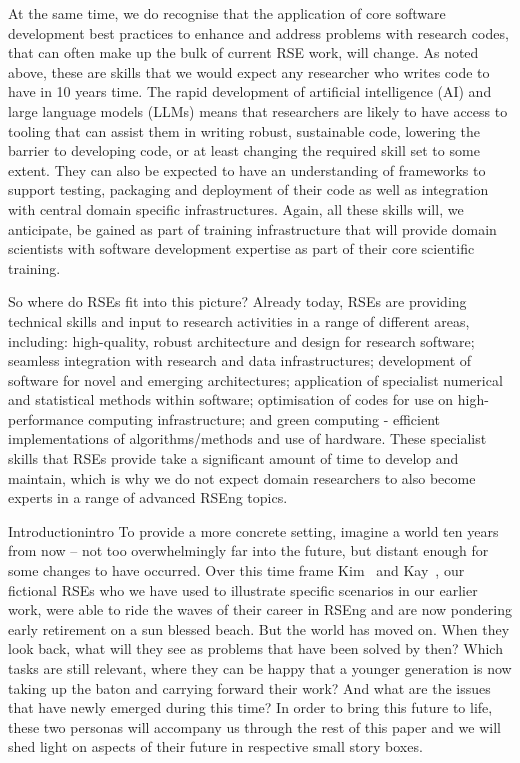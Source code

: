 \documentclass{eceasst}
\begin{document}
At the same time, we do recognise that the application of core software development best practices
to enhance and address problems with research codes, that can often make up the bulk of current RSE work, will change.
As noted above, these are skills that we would expect any researcher who writes code to have in 10 years time.
The rapid development of artificial intelligence (AI) and large language models
(LLMs) means that researchers are likely to have access to tooling that can assist
them in writing robust, sustainable code, lowering the barrier to developing code,
or at least changing the required skill set to some extent.
They can also be expected to have an understanding of frameworks to support testing, packaging and
deployment of their code as well as integration with central domain specific infrastructures.
Again, all these skills will, we anticipate, be gained as part of training infrastructure that will
provide domain scientists with software development expertise as part of their core scientific training.

So where do RSEs fit into this picture?
Already today, RSEs are providing technical skills and input to research activities in a range of different areas, including:
high-quality, robust architecture and design for research software;
seamless integration with research and data infrastructures;
development of software for novel and emerging architectures;
application of specialist numerical and statistical methods within software;
optimisation of codes for use on high-performance computing infrastructure;
and green computing - efficient implementations of algorithms/methods and use of hardware.
These specialist skills that RSEs provide take a significant amount of time to develop and maintain,
which is why we do not expect domain researchers to also become experts in a range of advanced RSEng topics.


\begin{story}{Introduction}{intro}
To provide a more concrete setting, imagine a world ten years from now --
not too overwhelmingly far into the future, but distant enough for some changes to have occurred.
Over this time frame Kim~\cite{Anzt2021} and Kay~\cite{Goth2024},
our fictional RSEs who we have used to illustrate specific scenarios in our earlier work,
were able to ride the waves of their career in RSEng and are now pondering early retirement on a sun blessed beach.
But the world has moved on.
When they look back, what will they see as problems that have been solved by then?
Which tasks are still relevant, where they can be happy that a younger generation is now taking up the baton and carrying forward their work?
And what are the issues that have newly emerged during this time?
In order to bring this future to life, these two personas will accompany us through the rest of this paper and we will shed light on aspects
of their future in respective small story boxes.
\end{story}
\end{document}
